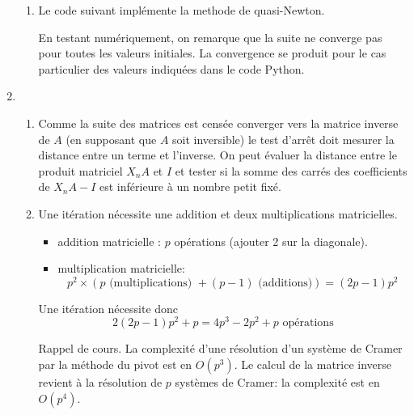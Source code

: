 \begin{enumerate}
\begin{enumerate}
  \item Le code suivant implémente la methode de quasi-Newton. 

En testant numériquement, on remarque que la suite ne converge pas pour toutes les valeurs initiales. La convergence se produit pour le cas particulier des valeurs indiquées dans le code Python.
\end{enumerate}

  \item
\begin{enumerate}
  \item Comme la suite des matrices est censée converger vers la matrice inverse de $A$ (en supposant que $A$ soit inversible) le test d'arrêt doit mesurer la distance entre un terme et l'inverse. On peut évaluer la distance entre le produit matriciel $X_nA$ et $I$ et tester si la somme des carrés des coefficients de $X_nA -I$ est inférieure à un nombre petit fixé.
  
  \item Une itération nécessite une addition et deux multiplications matricielles.
\begin{itemize}
  \item addition matricielle : $p$ opérations (ajouter 2 sur la diagonale).
  \item multiplication matricielle:
\begin{displaymath}
p^2\times \left( p\text{ (multiplications) } + (p-1)\text{ (additions)}\right)  = (2p-1)p^2  
\end{displaymath}
\end{itemize}
Une itération nécessite donc 
\begin{displaymath}
  2(2p-1)p^2 + p = 4 p^3 -2p^2 +p \text{ opérations}
\end{displaymath}

Rappel de cours.\newline
La complexité d'une résolution d'un système de Cramer par la méthode du pivot est en $O(p^3)$. Le calcul de la matrice inverse revient à la résolution de $p$ systèmes de Cramer: la complexité est en $O(p^4)$.
\end{enumerate}

\end{enumerate}

